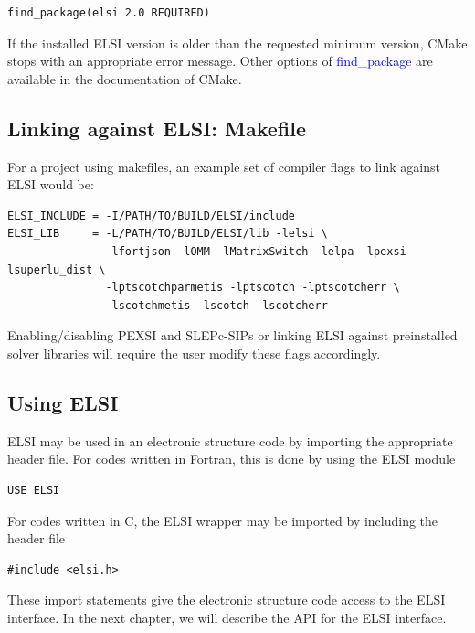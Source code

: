 \documentclass{report}
\begin{document}
\begin{verbatim}
find_package(elsi 2.0 REQUIRED)
\end{verbatim}

If the installed ELSI version is older than the requested minimum version, CMake stops with an appropriate error message.  Other options of \textcolor{blue}{find\_package} are available in the documentation of CMake.\\

\subsection{Linking against ELSI:  Makefile}
\label{subsec:import_makefile}
For a project using makefiles, an example set of compiler flags to link against ELSI would be:\\

\begin{verbatim}
ELSI_INCLUDE = -I/PATH/TO/BUILD/ELSI/include
ELSI_LIB     = -L/PATH/TO/BUILD/ELSI/lib -lelsi \
               -lfortjson -lOMM -lMatrixSwitch -lelpa -lpexsi -lsuperlu_dist \
               -lptscotchparmetis -lptscotch -lptscotcherr \
               -lscotchmetis -lscotch -lscotcherr
\end{verbatim}

Enabling/disabling PEXSI and SLEPc-SIPs or linking ELSI against preinstalled solver libraries will require the user modify these flags accordingly.\\

\subsection{Using ELSI}
\label{subsec:import_use}
ELSI may be used in an electronic structure code by importing the appropriate header file.  For codes written in Fortran, this is done by using the ELSI module\\

\begin{verbatim}
USE ELSI
\end{verbatim}

For codes written in C, the ELSI wrapper may be imported by including the header file\\

\begin{verbatim}
#include <elsi.h>
\end{verbatim}

These import statements give the electronic structure code access to the ELSI interface.  In the next chapter, we will describe the API for the ELSI interface.
\end{document}
